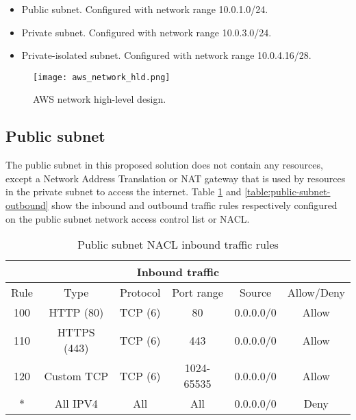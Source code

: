 \begin{itemize}
    \item Public subnet. Configured with network range 10.0.1.0/24.
    \item Private subnet. Configured with network range 10.0.3.0/24.
    \item Private-isolated subnet. Configured with network range 10.0.4.16/28.
\end{itemize}

\begin{figure}[H]
    \centering \texttt{[image: aws\_network\_hld.png]}
    \caption{AWS network high-level design.}
    \label{fig:aws-network-hld}
\end{figure}




\subsection{Public subnet}
\label{public-subnet}

The public subnet in this proposed solution does not contain any resources, except a Network Address Translation or NAT gateway that is used by resources in the private subnet to access the internet. Table \ref{table:public-subnet-inbound} and \ref{table:public-subnet-outbound} show the inbound and outbound traffic rules respectively configured on the public subnet network access control list or NACL.

\begin{table}[H]
    \centering
    \begin{tabular}{|c|c|c|c|c|c|}
        \hline
        \multicolumn{6}{|c|}{Inbound traffic}                               \\
        \hline
        Rule & Type        & Protocol & Port range & Source    & Allow/Deny \\
        \hline
        100  & HTTP (80)   & TCP (6)  & 80         & 0.0.0.0/0 & Allow      \\
        \hline
        110  & HTTPS (443) & TCP (6)  & 443        & 0.0.0.0/0 & Allow      \\
        \hline
        120  & Custom TCP  & TCP (6)  & 1024-65535 & 0.0.0.0/0 & Allow      \\
        \hline
        *    & All IPV4    & All      & All        & 0.0.0.0/0 & Deny       \\
        \hline
    \end{tabular}
    \caption{Public subnet NACL inbound traffic rules}
    \label{table:public-subnet-inbound}
\end{table}

